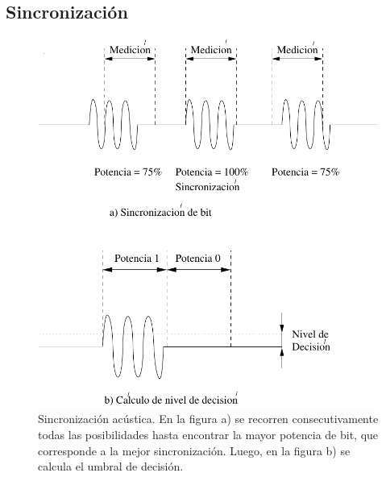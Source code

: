 \subsection{Sincronización}

\begin{figure}[t]
  \centering
    \includegraphics[width=4.5in]{graphs/acusync.pdf}
\caption {Sincronización acústica. En la figura a) se recorren consecutivamente todas las posibilidades hasta encontrar la mayor potencia de bit, que corresponde a la mejor sincronización. Luego, en la figura b) se calcula el umbral de decisión.}
\label{fig:acusync}
\end{figure}

